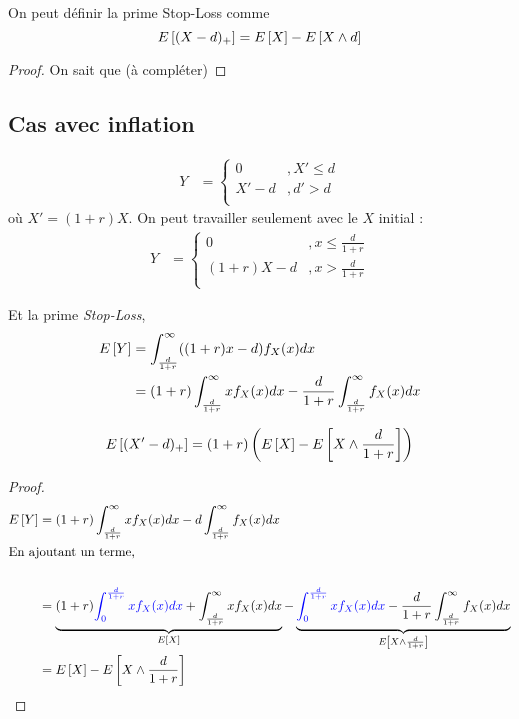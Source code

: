 \documentclass[12pt, french]{report}
\begin{document}
\begin{definition}
On peut définir la prime Stop-Loss comme
\begin{equation}
E \left[ (X-d)_+ \right] = E \left[ X \right] - E \left[ X \wedge d \right]
\end{equation}
\begin{proof}
On sait que (à compléter)
\end{proof}
\end{definition}

\subsection{Cas avec inflation}
\begin{align*}
Y	& = 
\begin{cases}
0		&, X' \leq d \\
X' - d	&, d' > d \\
\end{cases}
\end{align*}
où $X' = (1+r)X$. On peut travailler seulement avec le $X$ initial : 
\begin{align*}
Y	& = 
\begin{cases}
0			&, x \leq \frac{d}{1+r} \\
(1+r)X - d 	&, x > \frac{d}{1+r} \\
\end{cases}
\end{align*}

Et la prime \textit{Stop-Loss},
\begin{align*}
E \left[ Y \right]		& = \int_{\frac{d}{1+r}}^{\infty} ((1+r) x - d) f_X(x) dx \\
			& = (1+r) \int_{\frac{d}{1+r}}^{\infty} x f_X(x) dx - \frac{d}{1+r} \int_{\frac{d}{1+r}}^{\infty} f_X(x) dx \\
\end{align*}

\begin{definition}
\begin{equation}
E \left[ (X'-d)_+ \right] = (1+r) \left( E \left[ X \right] - E \left[ X \wedge \frac{d}{1+r} \right] \right)
\end{equation}
\end{definition}
\begin{proof}
\begin{align*}
E \left[ Y \right]	& = (1+r) \int_{\frac{d}{1+r}}^{\infty} x f_X(x) dx - d \int_{\frac{d}{1+r}}^{\infty} f_X(x) dx \\
	\shortintertext{En ajoutant un terme,} \\
	& = \underbrace{(1+r) \textcolor{blue}{\int_{0}^{\frac{d}{1+r}} x f_X(x) dx} + \int_{\frac{d}{1+r}}^{\infty} x f_X(x) dx}_{E \left[ X \right]} - \underbrace{\textcolor{blue}{ \int_{0}^{\frac{d}{1+r}} x f_X(x) dx} - \frac{d}{1+r} \int_{\frac{d}{1+r}}^{\infty} f_X(x) dx}_{E \left[ X \wedge \frac{d}{1+r} \right]} \\ 
	& = E \left[ X \right] - E \left[ X \wedge \frac{d}{1+r} \right] \\
\end{align*}
\end{proof}
\end{document}
